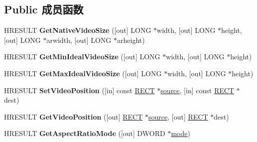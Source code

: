 \subsection*{Public 成员函数}
\begin{DoxyCompactItemize}
\item 
\mbox{\label{interface_i_v_m_r_windowless_control9_a30437b0bf202763b22a0da08ca2968f0}} 
H\+R\+E\+S\+U\+LT {\bfseries Get\+Native\+Video\+Size} (\mbox{[}out\mbox{]} L\+O\+NG $\ast$width, \mbox{[}out\mbox{]} L\+O\+NG $\ast$height, \mbox{[}out\mbox{]} L\+O\+NG $\ast$arwidth, \mbox{[}out\mbox{]} L\+O\+NG $\ast$arheight)
\item 
\mbox{\label{interface_i_v_m_r_windowless_control9_a7dcb96450264e43c273e49c25dbb4829}} 
H\+R\+E\+S\+U\+LT {\bfseries Get\+Min\+Ideal\+Video\+Size} (\mbox{[}out\mbox{]} L\+O\+NG $\ast$width, \mbox{[}out\mbox{]} L\+O\+NG $\ast$height)
\item 
\mbox{\label{interface_i_v_m_r_windowless_control9_a469a3f832d439fb1d317f9b4ebb6fd18}} 
H\+R\+E\+S\+U\+LT {\bfseries Get\+Max\+Ideal\+Video\+Size} (\mbox{[}out\mbox{]} L\+O\+NG $\ast$width, \mbox{[}out\mbox{]} L\+O\+NG $\ast$height)
\item 
\mbox{\label{interface_i_v_m_r_windowless_control9_ab36415dccfdf524216e684020624bd43}} 
H\+R\+E\+S\+U\+LT {\bfseries Set\+Video\+Position} (\mbox{[}in\mbox{]} const \hyperlink{structtag_r_e_c_t}{R\+E\+CT} $\ast$\hyperlink{structsource}{source}, \mbox{[}in\mbox{]} const \hyperlink{structtag_r_e_c_t}{R\+E\+CT} $\ast$dest)
\item 
\mbox{\label{interface_i_v_m_r_windowless_control9_a7165d54e0cf822cce8e92e96803b2504}} 
H\+R\+E\+S\+U\+LT {\bfseries Get\+Video\+Position} (\mbox{[}out\mbox{]} \hyperlink{structtag_r_e_c_t}{R\+E\+CT} $\ast$\hyperlink{structsource}{source}, \mbox{[}out\mbox{]} \hyperlink{structtag_r_e_c_t}{R\+E\+CT} $\ast$dest)
\item 
\mbox{\label{interface_i_v_m_r_windowless_control9_ab814768703a1a650c6622a7500051c76}} 
H\+R\+E\+S\+U\+LT {\bfseries Get\+Aspect\+Ratio\+Mode} (\mbox{[}out\mbox{]} D\+W\+O\+RD $\ast$\hyperlink{interfacevoid}{mode})

\end{DoxyCompactItemize}
